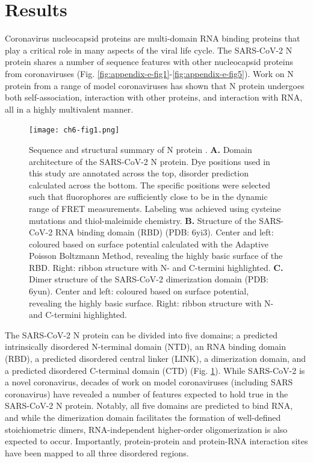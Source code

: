 \documentclass[../main.tex]{subfiles}
\begin{document}
    \section{Results}
        Coronavirus nucleocapsid proteins are multi-domain RNA binding proteins that play a critical role in many aspects of the viral life cycle\cite{Laude1995-bx,mcbride_coronavirus_2014}. The SARS-CoV-2 N protein shares a number of sequence features with other nucleocapsid proteins from coronaviruses (Fig. \ref{fig:appendix-e-fig1}-\ref{fig:appendix-e-fig5}). Work on N protein from a range of model coronaviruses has shown that N protein undergoes both self-association, interaction with other proteins, and interaction with RNA, all in a highly multivalent manner.

        \begin{figure}[!htb] %
            \centering
            \texttt{[image: ch6-fig1.png]}
            \caption[Sequence and structural summary of N protein.]
                {Sequence and structural summary of N protein . \textbf{A.} Domain architecture of the SARS-CoV-2 N protein. Dye positions used in this study are annotated across the top, disorder prediction calculated across the bottom. The specific positions were selected such that fluorophores are sufficiently close to be in the dynamic range of FRET measurements. Labeling was achieved using cysteine mutations and thiol-maleimide chemistry. \textbf{B.} Structure of the SARS-CoV-2 RNA binding domain (RBD) (PDB: 6yi3). Center and left: coloured based on surface potential calculated with the Adaptive Poisson Boltzmann Method\cite{Baker2001-ma}, revealing the highly basic surface of the RBD. Right: ribbon structure with N- and C-termini highlighted. \textbf{C.} Dimer structure of the SARS-CoV-2 dimerization domain (PDB: 6yun). Center and left: coloured based on surface potential, revealing the highly basic surface. Right: ribbon structure with N- and C-termini highlighted.}
            \label{fig:ch6-fig1}
        \end{figure}

        The SARS-CoV-2 N protein can be divided into five domains; a predicted intrinsically disordered N-terminal domain (NTD), an RNA binding domain (RBD), a predicted disordered central linker (LINK), a dimerization domain, and a predicted disordered C-terminal domain (CTD) (Fig. \ref{fig:ch6-fig1}). While SARS-CoV-2 is a novel coronavirus, decades of work on model coronaviruses (including SARS coronavirus) have revealed a number of features expected to hold true in the SARS-CoV-2 N protein. Notably, all five domains are predicted to bind RNA\cite{Chang2009-vd,Grossoehme2009-px,Cui2015-bu,Takeda2008-wl,Jayaram2006-rd,Yu2005-ar,Luo2006-et}, and while the dimerization domain facilitates the formation of well-defined stoichiometric dimers, RNA-independent higher-order oligomerization is also expected to occur\cite{Yu2005-ar,Chang2013-th,Robbins1986-lh,He2004-xy}. Importantly, protein-protein and protein-RNA interaction sites have been mapped to all three disordered regions.
\end{document}
